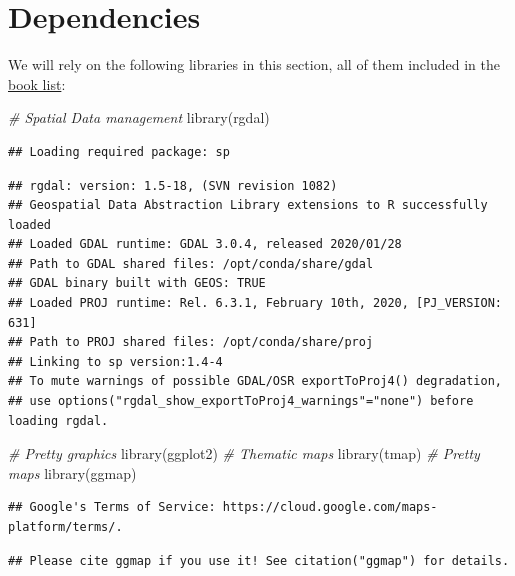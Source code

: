 \documentclass[
]{book}
\newenvironment{Shaded}{\begin{snugshade}}{\end{snugshade}}
\newcommand{\CommentTok}[1]{\textcolor[rgb]{0.56,0.35,0.01}{\textit{#1}}}
\newcommand{\FunctionTok}[1]{\textcolor[rgb]{0.00,0.00,0.00}{#1}}
\newcommand{\NormalTok}[1]{#1}
\begin{document}
\hypertarget{dependencies-2}{%
\section{Dependencies}\label{dependencies-2}}

We will rely on the following libraries in this section, all of them included in the \protect\hyperlink{Dependency-list}{book list}:

\begin{Shaded}
\begin{Highlighting}[]
\CommentTok{\# Spatial Data management}
\FunctionTok{library}\NormalTok{(rgdal)}
\end{Highlighting}
\end{Shaded}

\begin{verbatim}
## Loading required package: sp
\end{verbatim}

\begin{verbatim}
## rgdal: version: 1.5-18, (SVN revision 1082)
## Geospatial Data Abstraction Library extensions to R successfully loaded
## Loaded GDAL runtime: GDAL 3.0.4, released 2020/01/28
## Path to GDAL shared files: /opt/conda/share/gdal
## GDAL binary built with GEOS: TRUE 
## Loaded PROJ runtime: Rel. 6.3.1, February 10th, 2020, [PJ_VERSION: 631]
## Path to PROJ shared files: /opt/conda/share/proj
## Linking to sp version:1.4-4
## To mute warnings of possible GDAL/OSR exportToProj4() degradation,
## use options("rgdal_show_exportToProj4_warnings"="none") before loading rgdal.
\end{verbatim}

\begin{Shaded}
\begin{Highlighting}[]
\CommentTok{\# Pretty graphics}
\FunctionTok{library}\NormalTok{(ggplot2)}
\CommentTok{\# Thematic maps}
\FunctionTok{library}\NormalTok{(tmap)}
\CommentTok{\# Pretty maps}
\FunctionTok{library}\NormalTok{(ggmap)}
\end{Highlighting}
\end{Shaded}

\begin{verbatim}
## Google's Terms of Service: https://cloud.google.com/maps-platform/terms/.
\end{verbatim}

\begin{verbatim}
## Please cite ggmap if you use it! See citation("ggmap") for details.
\end{verbatim}
\end{document}
